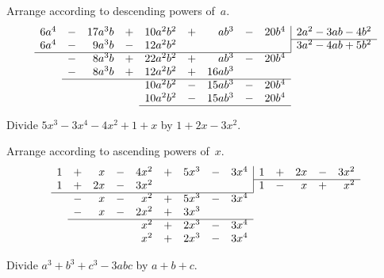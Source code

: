 \documentclass[12pt]{book}[2005/09/16]
\makeatletter
\newcommand{\Item}[1]{\vspace{4pt plus 16pt}\makebox[1em][r]{\textbf{#1}\ }}
\newcommand{\NoBar}[1]{\multicolumn{1}{@{}r}{#1}}
\makeatother
\begin{document}
Arrange according to descending powers of~$a$.
\[
\begin{array}{r*{4}{cr}|l}
6a^{4} &-&17a^{3}b &+& 10a^{2}b^{2} &+&  ab^{3} &-& 20b^{4} & 2a^{2} - 3ab - 4b^{2} \\
\cline{10-10}
6a^{4} &-& 9a^{3}b &-& 12a^{2}b^{2} & &         & &         & 3a^{2} - 4ab + 5b^{2} \\
\cline{1-9}
       &-& 8a^{3}b &+& 22a^{2}b^{2} &+&  ab^{3} &-& \NoBar{20b^{4}} \\
       &-& 8a^{3}b &+& 12a^{2}b^{2} &+&16ab^{3} \\
\cline{2-9}
       & &         & & 10a^{2}b^{2} &-&15ab^{3} &-& \NoBar{20b^{4}} \\
       & &         & & 10a^{2}b^{2} &-&15ab^{3} &-& \NoBar{20b^{4}} \\
\cline{5-9}
\end{array}
\]

\Item{5.}  Divide $5x^{3} - 3x^{4} - 4x^{2} + 1 + x$ by $1 + 2x - 3x^{2}$.

Arrange according to ascending powers of~$x$.
\[
\begin{array}{r*{4}{cr}|l*{2}{cr}}
1 &+&  x &-& 4x^{2} &+& 5x^{3} &-& 3x^{4} & 1 &+& 2x &-& 3x^{2} \\
\cline{10-14}
1 &+& 2x &-& 3x^{2} & &        & &        & 1 &-&  x &+&  x^{2} \\
\cline{1-9}
  &-&  x &-&  x^{2} &+& 5x^{3} &-& \NoBar{3x^{4}} \\
  &-&  x &-& 2x^{2} &+& 3x^{3} \\
\cline{2-9}
  & &    & &  x^{2} &+& 2x^{3} &-& \NoBar{3x^{4}} \\
  & &    & &  x^{2} &+& 2x^{3} &-& \NoBar{3x^{4}} \\
\end{array}
\]

\Item{6.}  Divide $a^{3} + b^{3} + c^{3} - 3abc$ by $a + b + c$.
\end{document}

